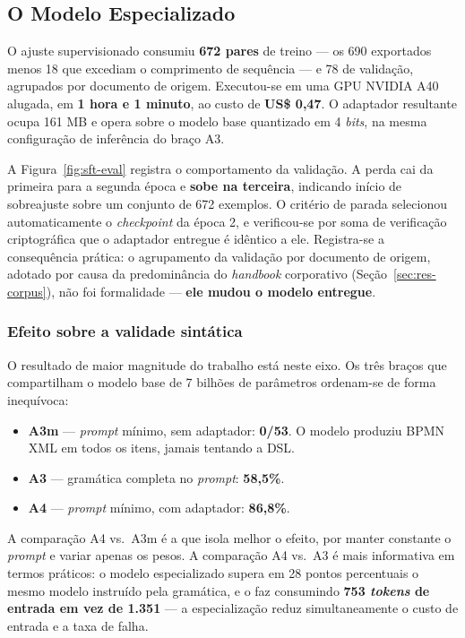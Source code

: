 \subsection{O Modelo Especializado}
\label{subsec:res-sft}

O ajuste supervisionado consumiu \textbf{672 pares} de treino --- os 690 exportados menos 18 que excediam o comprimento de sequência --- e 78 de validação, agrupados por documento de origem. Executou-se em uma GPU NVIDIA A40 alugada, em \textbf{1 hora e 1 minuto}, ao custo de \textbf{US\$ 0,47}. O adaptador resultante ocupa 161 MB e opera sobre o modelo base quantizado em 4 \textit{bits}, na mesma configuração de inferência do braço A3.



A Figura~\ref{fig:sft-eval} registra o comportamento da validação. A perda cai da primeira para a segunda época e \textbf{sobe na terceira}, indicando início de sobreajuste sobre um conjunto de 672 exemplos. O critério de parada selecionou automaticamente o \textit{checkpoint} da época 2, e verificou-se por soma de verificação criptográfica que o adaptador entregue é idêntico a ele. Registra-se a consequência prática: o agrupamento da validação por documento de origem, adotado por causa da predominância do \textit{handbook} corporativo (Seção~\ref{sec:res-corpus}), não foi formalidade --- \textbf{ele mudou o modelo entregue}.

\subsubsection*{Efeito sobre a validade sintática}

O resultado de maior magnitude do trabalho está neste eixo. Os três braços que compartilham o modelo base de 7 bilhões de parâmetros ordenam-se de forma inequívoca:

\begin{itemize}
	\item \textbf{A3m} --- \textit{prompt} mínimo, sem adaptador: \textbf{0/53}. O modelo produziu BPMN XML em todos os itens, jamais tentando a DSL.
	\item \textbf{A3} --- gramática completa no \textit{prompt}: \textbf{58,5\%}.
	\item \textbf{A4} --- \textit{prompt} mínimo, com adaptador: \textbf{86,8\%}.
\end{itemize}

A comparação A4 vs.\ A3m é a que isola melhor o efeito, por manter constante o \textit{prompt} e variar apenas os pesos. A comparação A4 vs.\ A3 é mais informativa em termos práticos: o modelo especializado supera em 28 pontos percentuais o mesmo modelo instruído pela gramática, e o faz consumindo \textbf{753 \textit{tokens} de entrada em vez de 1.351} --- a especialização reduz simultaneamente o custo de entrada e a taxa de falha.

